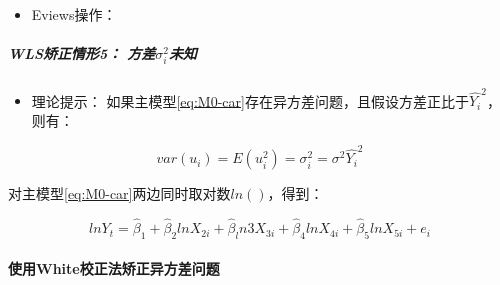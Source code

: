 \documentclass[12pt,(landscape,a4paper),(portrait,a4paper)]{article}
\providecommand{\tightlist}{%
  \setlength{\itemsep}{0pt}\setlength{\parskip}{0pt}}
\let\oldparagraph\paragraph
\renewcommand{\paragraph}[1]{\oldparagraph{#1}\mbox{}}
\let\oldsubparagraph\subparagraph
\renewcommand{\subparagraph}[1]{\oldsubparagraph{#1}\mbox{}}
\begin{document}
\begin{itemize}
\tightlist
\item
  Eviews操作：
\end{itemize}

\hypertarget{wls5-sigma2_i}{%
\subparagraph{\texorpdfstring{WLS矫正情形5：
方差\(\sigma^2_i\)未知}{WLS矫正情形5： 方差\textbackslash{}sigma\^{}2\_i未知}}\label{wls5-sigma2_i}}

\begin{itemize}
\tightlist
\item
  理论提示：
  如果主模型\eqref{eq:M0-car}存在异方差问题，且假设方差正比于\(\hat{Y_i}^2\)，则有：
\end{itemize}

\begin{equation}
var(u_i)=E(u^2_i)=\sigma^2_i=\sigma^2\hat{Y_i}^2 \label{eq:WLS-Y2}
\end{equation}

对主模型\eqref{eq:M0-car}两边同时取对数\(ln()\)，得到：

\begin{equation}
ln{Y_t} =\hat{\beta}_1+\hat{\beta}_2ln{X_{2i}}+\hat{\beta}_ln{3X_{3i}}+\hat{\beta}_4ln{X_{4i}}+\hat{\beta}_5ln{X_{5i}}+e_{i} \label{eq:WLS-ln}
\end{equation}

\hypertarget{white}{%
\paragraph{使用White校正法矫正异方差问题}\label{white}}
\end{document}
